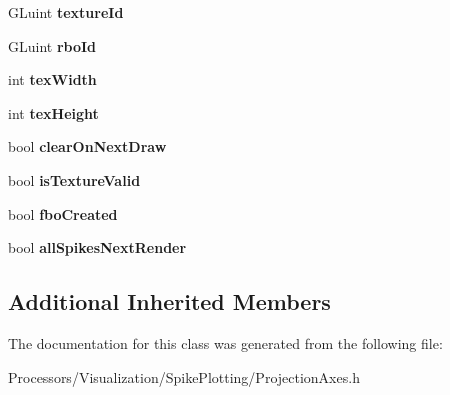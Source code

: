 \begin{DoxyCompactItemize}
\item 
\hypertarget{classProjectionAxes_aaf12fb5eb0b3cc8f6f256bf42790b20f}{G\-Luint {\bfseries texture\-Id}}\label{classProjectionAxes_aaf12fb5eb0b3cc8f6f256bf42790b20f}

\item 
\hypertarget{classProjectionAxes_a33abda6700f7276e75b7f2f295b0299e}{G\-Luint {\bfseries rbo\-Id}}\label{classProjectionAxes_a33abda6700f7276e75b7f2f295b0299e}

\item 
\hypertarget{classProjectionAxes_a0515ac3013f3dd5463276d4dd29a84b3}{int {\bfseries tex\-Width}}\label{classProjectionAxes_a0515ac3013f3dd5463276d4dd29a84b3}

\item 
\hypertarget{classProjectionAxes_ad31011ca9963309e7001c5431a078892}{int {\bfseries tex\-Height}}\label{classProjectionAxes_ad31011ca9963309e7001c5431a078892}

\item 
\hypertarget{classProjectionAxes_a2bc0df7a19b189984f35a6a2b0e62140}{bool {\bfseries clear\-On\-Next\-Draw}}\label{classProjectionAxes_a2bc0df7a19b189984f35a6a2b0e62140}

\item 
\hypertarget{classProjectionAxes_a19f0f227afbf46f180484bcddba6f86e}{bool {\bfseries is\-Texture\-Valid}}\label{classProjectionAxes_a19f0f227afbf46f180484bcddba6f86e}

\item 
\hypertarget{classProjectionAxes_a0ad6b4ee29d3fee0279b432b98b7a115}{bool {\bfseries fbo\-Created}}\label{classProjectionAxes_a0ad6b4ee29d3fee0279b432b98b7a115}

\item 
\hypertarget{classProjectionAxes_a0a0b1a9ef33eaae6291c3bcab1ed36ea}{bool {\bfseries all\-Spikes\-Next\-Render}}\label{classProjectionAxes_a0a0b1a9ef33eaae6291c3bcab1ed36ea}

\end{DoxyCompactItemize}
\subsection*{Additional Inherited Members}


The documentation for this class was generated from the following file\-:\begin{DoxyCompactItemize}
\item 
Processors/\-Visualization/\-Spike\-Plotting/Projection\-Axes.\-h\end{DoxyCompactItemize}
